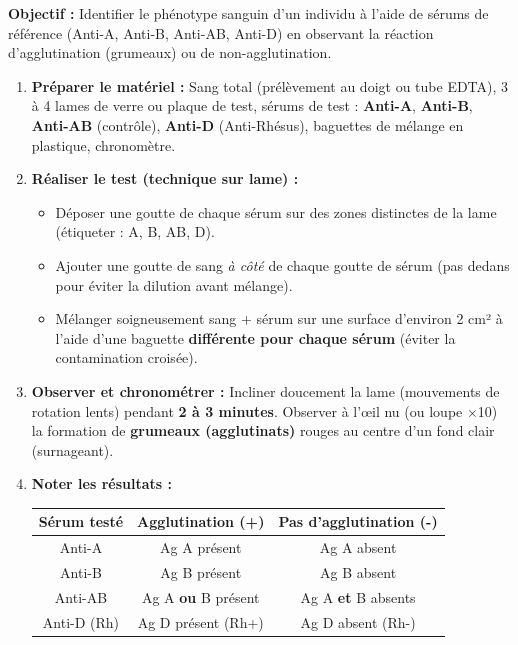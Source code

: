 \documentclass[11pt]{article}
\begin{document}
\begin{methode}
    \textbf{Objectif :} Identifier le phénotype sanguin d'un individu à l'aide de sérums de référence (Anti-A, Anti-B, Anti-AB, Anti-D) en observant la réaction d'agglutination (grumeaux) ou de non-agglutination.
    \begin{enumerate}
        \item \textbf{Préparer le matériel :} Sang total (prélèvement au doigt ou tube EDTA), 3 à 4 lames de verre ou plaque de test, sérums de test : \textbf{Anti-A}, \textbf{Anti-B}, \textbf{Anti-AB} (contrôle), \textbf{Anti-D} (Anti-Rhésus), baguettes de mélange en plastique, chronomètre.
        \item \textbf{Réaliser le test (technique sur lame) :}
        \begin{itemize}
            \item Déposer une goutte de chaque sérum sur des zones distinctes de la lame (étiqueter : A, B, AB, D).
            \item Ajouter une goutte de sang \emph{à côté} de chaque goutte de sérum (pas dedans pour éviter la dilution avant mélange).
            \item Mélanger soigneusement sang + sérum sur une surface d'environ 2 cm² à l'aide d'une baguette \textbf{différente pour chaque sérum} (éviter la contamination croisée).
        \end{itemize}
        \item \textbf{Observer et chronométrer :} Incliner doucement la lame (mouvements de rotation lents) pendant \textbf{2 à 3 minutes}. Observer à l'œil nu (ou loupe $\times$10) la formation de \textbf{grumeaux (agglutinats)} rouges au centre d'un fond clair (surnageant).
        \item \textbf{Noter les résultats :} 
        \begin{center}
            \begin{tabular}{|c|c|c|}
                \hline
                \textbf{Sérum testé} & \textbf{Agglutination (+)} & \textbf{Pas d'agglutination (-)} \\ \hline
                Anti-A & Ag A présent & Ag A absent \\ \hline
                Anti-B & Ag B présent & Ag B absent \\ \hline
                Anti-AB & Ag A \textbf{ou} B présent & Ag A \textbf{et} B absents \\ \hline
                Anti-D (Rh) & Ag D présent (Rh+) & Ag D absent (Rh-) \\ \hline

\end{tabular}
\end{center}
\end{enumerate}
\end{methode}
\end{document}
